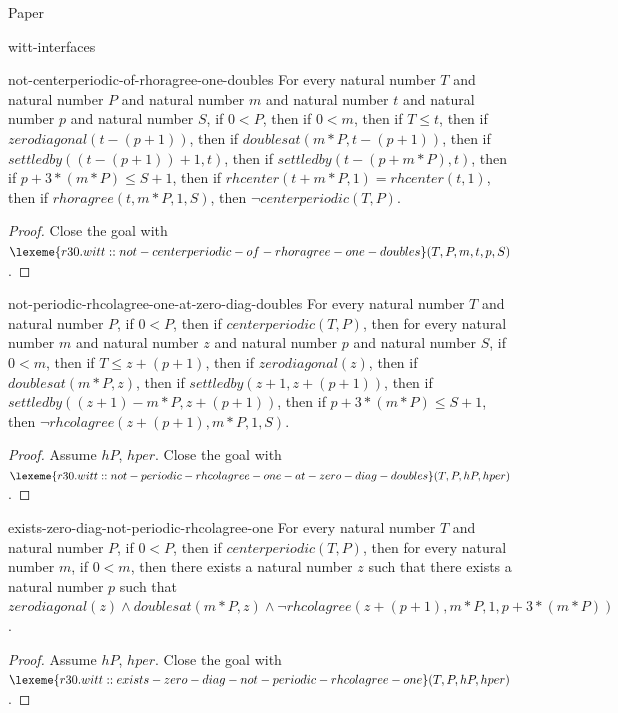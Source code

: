 \begin{lexlean}{Paper}
\begin{section}{witt-interfaces}
  \begin{theorem}{not-centerperiodic-of-rhoragree-one-doubles}
  For every natural number \(T\) and natural number \(P\) and natural number \(m\) and natural number \(t\) and natural number \(p\) and natural number \(S\), if \(0 < P\), then if \(0 < m\), then if \(T ≤ t\), then if \(zerodiagonal(t - (p + 1))\), then if \(doublesat(m * P, t - (p + 1))\), then if \(settledby((t - (p + 1)) + 1, t)\), then if \(settledby(t - (p + m * P), t)\), then if \(p + 3 * (m * P) ≤ S + 1\), then if \(rhcenter(t + m * P, 1) = rhcenter(t, 1)\), then if \(rhoragree(t, m * P, 1, S)\), then \(¬centerperiodic(T, P)\).
  \begin{proof}
  Close the goal with \(\lexeme{r30.witt::not-centerperiodic-of-rhoragree-one-doubles}(T, P, m, t, p, S)\).
  \end{proof}
  \end{theorem}

  \begin{theorem}{not-periodic-rhcolagree-one-at-zero-diag-doubles}
  For every natural number \(T\) and natural number \(P\), if \(0 < P\), then if \(centerperiodic(T, P)\), then for every natural number \(m\) and natural number \(z\) and natural number \(p\) and natural number \(S\), if \(0 < m\), then if \(T ≤ z + (p + 1)\), then if \(zerodiagonal(z)\), then if \(doublesat(m * P, z)\), then if \(settledby(z + 1, z + (p + 1))\), then if \(settledby((z + 1) - m * P, z + (p + 1))\), then if \(p + 3 * (m * P) ≤ S + 1\), then \(¬rhcolagree(z + (p + 1), m * P, 1, S)\).
  \begin{proof}
  Assume \(hP\), \(hper\).
  Close the goal with \(\lexeme{r30.witt::not-periodic-rhcolagree-one-at-zero-diag-doubles}(T, P, hP, hper)\).
  \end{proof}
  \end{theorem}

  \begin{theorem}{exists-zero-diag-not-periodic-rhcolagree-one}
  For every natural number \(T\) and natural number \(P\), if \(0 < P\), then if \(centerperiodic(T, P)\), then for every natural number \(m\), if \(0 < m\), then there exists a natural number \(z\) such that there exists a natural number \(p\) such that \(zerodiagonal(z) ∧ doublesat(m * P, z) ∧ ¬rhcolagree(z + (p + 1), m * P, 1, p + 3 * (m * P))\).
  \begin{proof}
  Assume \(hP\), \(hper\).
  Close the goal with \(\lexeme{r30.witt::exists-zero-diag-not-periodic-rhcolagree-one}(T, P, hP, hper)\).
  \end{proof}
  \end{theorem}


\end{section}
\end{lexlean}
